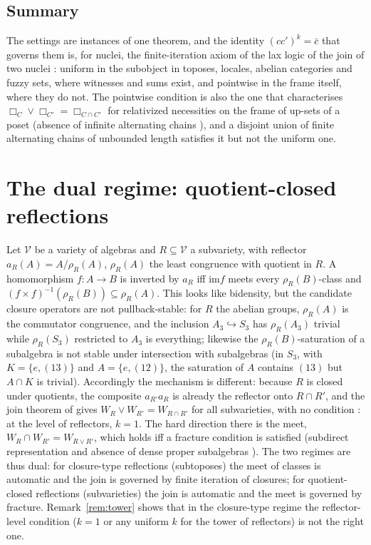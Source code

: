 \documentclass[11pt]{amsart}
\theoremstyle{definition}
\newcommand{\im}{\mathrm{im}}
\begin{document}
\subsection{Summary}
The settings are instances of one theorem, and the identity
$(cc')^k=\bar c$ that governs them is, for nuclei, the finite-iteration
axiom of the lax logic of the join of two nuclei \cite{Laxjoin}: uniform in
the subobject in toposes, locales, abelian categories and fuzzy sets, where
witnesses and sums exist, and pointwise in the frame itself, where they do
not. The pointwise condition is also the one that characterises
$\Box_C\vee\Box_{C'}=\Box_{C\cap C'}$ for relativized necessities on the
frame of up-sets of a poset (absence of infinite alternating chains
\cite{Relnec}), and a disjoint union of finite alternating chains of
unbounded length satisfies it but not the uniform one.

\section{The dual regime: quotient-closed reflections}\label{sec:dual}

Let $\mathcal V$ be a variety of algebras and $R\subseteq\mathcal V$ a
subvariety, with reflector $a_R(A)=A/\rho_R(A)$, $\rho_R(A)$ the least
congruence with quotient in $R$. A homomorphism $f\colon A\to B$ is
inverted by $a_R$ iff $\im f$ meets every $\rho_R(B)$-class and
$(f\times f)^{-1}(\rho_R(B))\subseteq\rho_R(A)$. This looks like bidensity,
but the candidate closure operators are not pullback-stable: for
$R$ the abelian groups, $\rho_R(A)$ is the commutator congruence, and the
inclusion $A_3\hookrightarrow S_3$ has $\rho_R(A_3)$ trivial while
$\rho_R(S_3)$ restricted to $A_3$ is everything; likewise the
$\rho_R(B)$-saturation of a subalgebra is not stable under intersection
with subalgebras (in $S_3$, with $K=\{e,(13)\}$ and $A=\{e,(12)\}$, the
saturation of $A$ contains $(13)$ but $A\cap K$ is trivial). Accordingly
the mechanism is different: because $R$ is closed under quotients, the
composite $a_{R'}a_R$ is already the reflector onto $R\cap R'$, and the
join theorem of \cite[Thm.~4.1]{Postnikov} gives $W_R\vee W_{R'}=
W_{R\cap R'}$ for all subvarieties, with no condition
\cite[Thm.~1.1]{Varieties}: at the level of reflectors, $k=1$. The hard
direction there is the meet, $W_R\cap W_{R'}=W_{R\vee R'}$, which holds iff
a fracture condition is satisfied (subdirect representation and absence of
dense proper subalgebras \cite[Thm.~1.2]{Varieties}). The two regimes are
thus dual: for closure-type reflections (subtoposes) the meet of classes
is automatic and the join is governed by finite iteration of closures;
for quotient-closed reflections (subvarieties) the join is automatic and
the meet is governed by fracture. Remark~\ref{rem:tower} shows that in the
closure-type regime the reflector-level condition ($k=1$ or any uniform
$k$ for the tower of reflectors) is not the right one.
\end{document}

